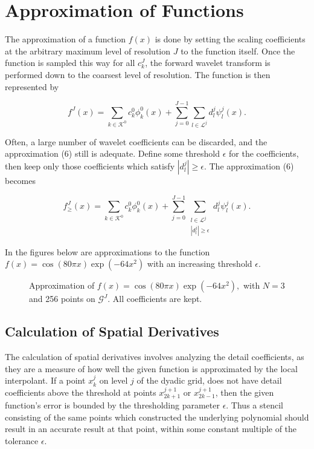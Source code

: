 \documentclass[11pt]{article}
\begin{document}

\section{Approximation of Functions}
The approximation of a function $f(x)$ is done by setting the scaling coefficients at the arbitrary maximum level of 
resolution $J$ to the function itself. Once the function is sampled this way for all $c_{k}^{J}$, the forward wavelet 
transform is performed down to the coarsest level of resolution. The function is then represented by 

\begin{equation}
        f^J(x)=\sum_{k \in \mathcal{K}^0} c_{k}^{0} \phi_{k}^{0}(x) + \sum_{j=0}^{J-1} \sum_{l \in \mathcal{L}^j}
                d_{l}^{j} \psi_{l}^{j}(x).
\end{equation}

Often, a large number of wavelet coefficients can be discarded, and the approximation (6) still is adequate. Define 
some threshold $\epsilon$ for the coefficients, then keep only those coefficients which satisfy 
$|d_{l}^{j}| \geq \epsilon$. The approximation (6) becomes 

\begin{equation}
        f_{\geq}^{J}(x)=\sum_{k \in \mathcal{K}^0} c_{k}^{0} \phi_{k}^{0}(x) + \sum_{j=0}^{J-1} 
        \sum_{ \substack{ l \in \mathcal{L}^j \\ |d_{l}^{j}| \geq \epsilon} } d_{l}^{j} \psi_{l}^{j}(x).
\end{equation}

In the figures below are approximations to the function $f(x)=\cos{(80 \pi x)} \exp{(-64 x^2)}$ with an increasing threshold 
$\epsilon$.
\begin{figure}[H]
	\center
	
	\caption{Approximation of $f(x)=\cos{(80 \pi x)} \exp{(-64 x^2)},$ with $N=3$ and 256 points on $\mathcal{G}^J$. All coefficients are kept.}
\end{figure}

\subsection{Calculation of Spatial Derivatives}
The calculation of spatial derivatives involves analyzing the detail coefficients, as they are a measure of how well the 
given function is approximated by the local interpolant. If a point $x_{k}^{j}$ on level $j$ of the dyadic grid, does 
not have detail coefficients above the threshold at points $x_{2k+1}^{j+1}$ or $x_{2k-1}^{j+1}$, then the given 
function's error is bounded by the thresholding parameter $\epsilon$.  Thus a stencil consisting of the same points
which constructed the underlying polynomial should result in an accurate result at that point, 
within some constant multiple of the tolerance $\epsilon$.
\end{document}
